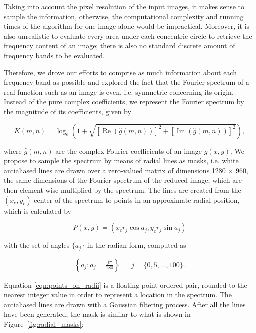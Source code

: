Taking into account the pixel resolution of the input images, it makes sense to sample the information, otherwise, the computational complexity and running times of the algorithm for one image alone would be impractical. Moreover, it is also unrealistic to evaluate every area under each concentric circle to retrieve the frequency content of an image; there is also no standard discrete amount of frequency bands to be evaluated.

Therefore, we drove our efforts to comprise as much information about each frequency band as possible and explored the fact that the Fourier spectrum of a real function such as an image is even, i.e. symmetric concerning its origin. Instead of the pure complex coefficients, we represent the Fourier spectrum by the magnitude of its coefficients, given by

\begin{equation}
\label{eqn:magnitude_of_DFT}
K(m,n) = 
    \log_{e}{\left(1
    + \sqrt{
        [\operatorname{Re}{(\hat{g}(m,n))}]^{2}
        + [\operatorname{Im}{(\hat{g}(m,n))}]^{2}
      }
    \right)},
\end{equation}

\noindent where $\hat{g}(m,n)$ are the complex Fourier coefficients of an image $g(x,y)$. We propose to sample the spectrum by means of radial lines as masks, i.e. white antialiased lines are drawn over a zero-valued matrix of dimensions 1280 $\times$ 960, the same dimensions of the Fourier spectrum of the reduced image, which are then element-wise multiplied by the spectrum. The lines are created from the $(x_{c},y_{c})$ center of the spectrum to points in an approximate radial position, which is calculated by

\begin{equation}
\label{eqn:points_on_radii}
P(x,y) = 
    (
    x_{c} r_{j} \cos{a_{j}}, 
    y_{c} r_{j} \sin{a_{j}}
    )
\end{equation}

\noindent with the set of angles $\{a_{j}\}$ in the radian form, computed as

\begin{align}
\label{eqn:angles}
\left\{
a_{j} : a_{j} = 
\frac{j \pi}{180}
\right\}
&&  j = \{0,5,...,100\}.
\end{align}

Equation
\ref{eqn:points_on_radii} is a
floating-point ordered pair, rounded to the nearest integer value in order to represent a location in the spectrum. The
antialiased lines are drawn with a Gaussian filtering process. After all the lines have been generated, the mask is similar to what is shown in Figure~\ref{fig:radial_masks}:


